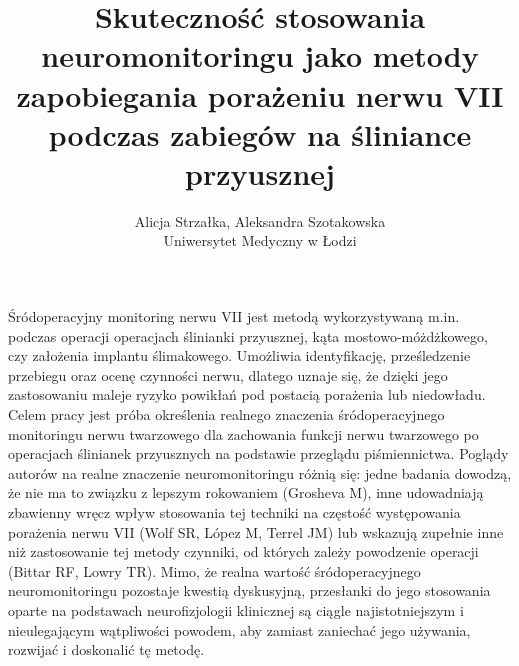 \documentclass[12pt, a4paper]{article}
\begin{document}
\title{Skuteczność stosowania neuromonitoringu jako metody zapobiegania porażeniu nerwu VII podczas zabiegów na śliniance przyusznej}
\author{Alicja Strzałka, Aleksandra Szotakowska \\Uniwersytet Medyczny w Łodzi}
\date {}
\maketitle
\thispagestyle{title}
Śródoperacyjny monitoring nerwu VII jest metodą wykorzystywaną m.in. podczas operacji operacjach ślinianki przyusznej, kąta mostowo-móżdżkowego, czy założenia implantu ślimakowego. Umożliwia identyfikację, prześledzenie przebiegu oraz ocenę czynności nerwu, dlatego uznaje się, że dzięki jego zastosowaniu maleje ryzyko powikłań pod postacią porażenia lub niedowładu. 
Celem pracy jest próba określenia realnego znaczenia śródoperacyjnego monitoringu nerwu twarzowego dla zachowania funkcji nerwu twarzowego po operacjach ślinianek przyusznych na podstawie przeglądu piśmiennictwa.
Poglądy autorów na realne znaczenie neuromonitoringu różnią się: jedne badania dowodzą, że nie ma to związku z lepszym rokowaniem (Grosheva M), inne udowadniają zbawienny wręcz wpływ stosowania tej techniki na częstość występowania porażenia nerwu VII (Wolf SR, López M, Terrel JM) lub wskazują zupełnie inne niż zastosowanie tej metody czynniki, od których zależy powodzenie operacji (Bittar RF, Lowry TR).
Mimo, że realna wartość śródoperacyjnego neuromonitoringu pozostaje kwestią dyskusyjną, przesłanki do jego stosowania oparte na podstawach neurofizjologii klinicznej są ciągle najistotniejszym i nieulegającym wątpliwości powodem, aby zamiast zaniechać jego używania, rozwijać i doskonalić tę metodę.
\end{document}
